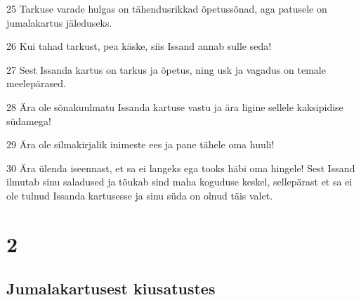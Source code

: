 \par 25 Tarkuse varade hulgas on tähendusrikkad õpetussõnad, aga patusele on jumalakartus jäleduseks.
\par 26 Kui tahad tarkust, pea käske, siis Issand annab sulle seda!
\par 27 Sest Issanda kartus on tarkus ja õpetus, ning usk ja vagadus on temale meelepärased.
\par 28 Ära ole sõnakuulmatu Issanda kartuse vastu ja ära ligine sellele kaksipidise südamega!
\par 29 Ära ole silmakirjalik inimeste ees ja pane tähele oma huuli!
\par 30 Ära ülenda iseennast, et sa ei langeks ega tooks häbi oma hingele! Sest Issand ilmutab sinu saladused ja tõukab sind maha koguduse keskel, sellepärast et sa ei ole tulnud Issanda kartusesse ja sinu süda on olnud täis valet.

\chapter{2}

\section*{Jumalakartusest kiusatustes}

